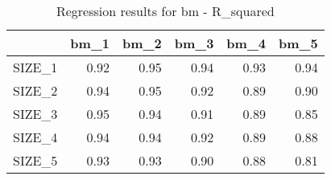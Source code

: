 \begin{table}[ht]
\centering
\caption{Regression results for bm - R_squared} 
\begin{tabular}{rrrrrr}
  \hline
 & bm\_1 & bm\_2 & bm\_3 & bm\_4 & bm\_5 \\ 
  \hline
SIZE\_1 & 0.92 & 0.95 & 0.94 & 0.93 & 0.94 \\ 
  SIZE\_2 & 0.94 & 0.95 & 0.92 & 0.89 & 0.90 \\ 
  SIZE\_3 & 0.95 & 0.94 & 0.91 & 0.89 & 0.85 \\ 
  SIZE\_4 & 0.94 & 0.94 & 0.92 & 0.89 & 0.88 \\ 
  SIZE\_5 & 0.93 & 0.93 & 0.90 & 0.88 & 0.81 \\ 
   \hline
\end{tabular}
\end{table}


